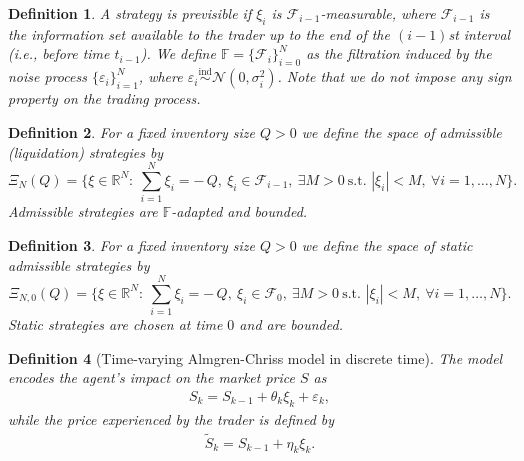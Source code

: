 \documentclass[final,3p,authoryear,12pt]{elsarticle}
\newtheorem{definition}{Definition}
\begin{document}

\begin{definition}
\label{definition:previsible_strategy}
A strategy is previsible if $\xi_i$ is $\mathcal{F}_{i-1}$-measurable, where
$\mathcal{F}_{i-1}$ is the information set available to the trader up to the
end of the $(i-1)$st interval (i.e., before time $t_{i-1}$). We define
$\mathbb{F}=\{\mathcal{F}_i\}_{i=0}^{N}$ as the filtration induced by the noise
process $\{\varepsilon_i\}_{i=1}^{N}$, where
$\varepsilon_i\overset{\text{ind}}{\sim}\mathcal{N}(0,\sigma^{2}_i)$.
%
Note that we do not impose any sign property on the trading process.
\end{definition}


\begin{definition}
\label{definition:admissible_strategy}
For a fixed inventory size \(Q>0\) we define the space of admissible
(liquidation) strategies by
\[
\Xi_N(Q)
= \Big\{\xi\in \mathbb{R}^N:\ \sum_{i=1}^{N}\xi_{i} = -\,Q,\
\xi_i\in\mathcal{F}_{i-1},\ \exists M > 0\ \text{s.t. } |\xi_{i}| < M,\
\forall i=1,\dots, N\Big\}.
\]
Admissible strategies are \(\mathbb{F}\)-adapted and bounded.
\end{definition}


\begin{definition}
\label{definition:static_admissible_strategy}
For a fixed inventory size \(Q>0\) we define the space of static admissible
strategies by
\[
\Xi_{N,0}(Q)
= \Big\{\xi\in \mathbb{R}^N:\ \sum_{i=1}^{N}\xi_{i} = -\,Q,\
\xi_i\in\mathcal{F}_{0},\ \exists M > 0\ \text{s.t. } |\xi_{i}| < M,\
\forall i=1,\dots, N\Big\}.
\]
Static strategies are chosen at time \(0\) and are bounded.
\end{definition}



\begin{definition}[Time-varying Almgren-Chriss model in discrete time]
The  \cite{almgren2001optimal} model encodes the agent's impact on the market price $S$ as  
\begin{eqnarray}
\label{eq:S}
    S_{k}=S_{k-1}+\theta_{k} \xi_{k} + \varepsilon_{k},
\end{eqnarray}
while the price experienced by the trader is defined by 
\begin{eqnarray}
    \label{eq:S_tilde}
    \tilde{S}_{k} = S_{k-1} + \eta_{k} \xi_{k}.
\end{eqnarray}
\end{definition}
\end{document}
